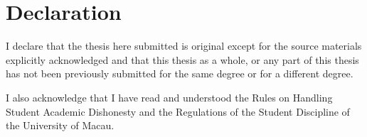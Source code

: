 \thispagestyle{plain}
\chapter*{\hfill \normalsize{Declaration} \hfill}

\noindent I declare that the thesis here submitted is original except for the source materials explicitly acknowledged and that this thesis as a whole, or any part of this thesis has not been previously submitted for the same degree or for a different degree.

\noindent I also acknowledge that I have read and understood the Rules on Handling Student Academic Dishonesty and the Regulations of the Student Discipline of the University of Macau.


\vfill

